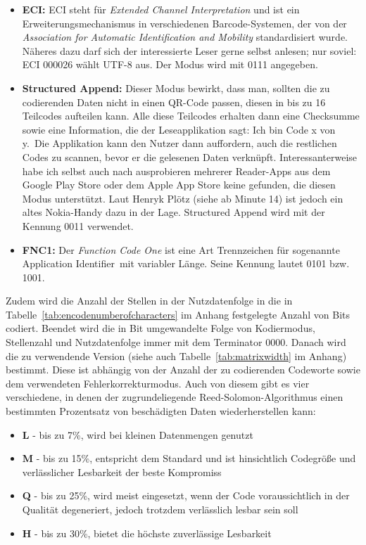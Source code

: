 \begin{itemize}
	\item \textbf{ECI:} ECI steht für \textit{Extended Channel Interpretation} und ist ein Erweiterungsmechanismus in verschiedenen Barcode-Systemen, der von der \textit{Association for Automatic Identification and Mobility} standardisiert wurde. Näheres dazu darf sich der interessierte Leser gerne selbst anlesen; nur soviel: ECI 000026 wählt UTF-8 aus. Der Modus wird mit 0111 angegeben.
	\item \textbf{Structured Append:} Dieser Modus bewirkt, dass man, sollten die zu codierenden Daten nicht in einen QR-Code passen, diesen in bis zu 16 Teilcodes aufteilen kann. Alle diese Teilcodes erhalten dann eine Checksumme sowie eine Information, die der Leseapplikation sagt: \glqq Ich bin Code x von y.\grqq~Die Applikation kann den Nutzer dann auffordern, auch die restlichen Codes zu scannen, bevor er die gelesenen Daten verknüpft. Interessanterweise habe ich selbst auch nach ausprobieren mehrerer Reader-Apps aus dem Google Play Store oder dem Apple App Store keine gefunden, die diesen Modus unterstützt. Laut Henryk Plötz (siehe \cite{Plotz2015} ab Minute 14) ist jedoch ein altes Nokia-Handy dazu in der Lage. Structured Append wird mit der Kennung 0011 verwendet.
	\item \textbf{FNC1:} Der \textit{Function Code One} ist eine Art Trennzeichen für sogenannte \glqq Application Identifier\grqq~mit variabler Länge. Seine Kennung lautet 0101 bzw. 1001.
\end{itemize}
Zudem wird die Anzahl der Stellen in der Nutzdatenfolge in die in Tabelle~\ref{tab:encodenumberofcharacters} im Anhang festgelegte Anzahl von Bits codiert. 
Beendet wird die in Bit umgewandelte Folge von Kodiermodus, Stellenzahl und Nutzdatenfolge immer mit dem Terminator 0000.
Danach wird die zu verwendende Version (siehe auch Tabelle~\ref{tab:matrixwidth} im Anhang) bestimmt. Diese ist abhängig von der Anzahl der zu codierenden Codeworte sowie dem verwendeten Fehlerkorrekturmodus. Auch von diesem gibt es vier verschiedene, in denen der zugrundeliegende Reed-Solomon-Algorithmus einen bestimmten Prozentsatz von beschädigten Daten wiederherstellen kann:
\begin{itemize}
	\item \textbf{L} - bis zu 7\%, wird bei kleinen Datenmengen genutzt
	\item \textbf{M} - bis zu 15\%, entspricht dem Standard und ist hinsichtlich Codegröße und verlässlicher Lesbarkeit der beste Kompromiss\pagebreak
	\item \textbf{Q} - bis zu 25\%, wird meist eingesetzt, wenn der Code voraussichtlich in der Qualität degeneriert, jedoch trotzdem verlässlich lesbar sein soll
	\item \textbf{H} - bis zu 30\%, bietet die höchste zuverlässige Lesbarkeit
\end{itemize}

